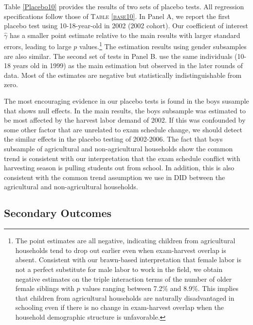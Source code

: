 \documentclass[12pt,letterpaper]{article}
\newcommand{\0}{\ensuremath{\mbox{\boldmath $0$}}}
\begin{document}
Table \ref{Placebo10} provides the results of two sets of placebo tests. All regression specifications follow those of \textsc{Table \ref{base10}}. In Panel A, we report the first placebo test using 10-18-year-old in 2002 (2002 cohort). Our coefficient of interest $\hat{\gamma}$ has a smaller point estimate relative to the main results with larger standard errors, leading to large $p$ values.\footnote{The point estimates are all negative, indicating children from agricultural households tend to drop out earlier even when exam-harvest overlap is absent. Consistent with our brawn-based interpretation that female labor is not a perfect substitute for male labor to work in the field, we obtain negative estimates on the triple interaction terms of the number of older female siblings with $p$ values ranging between 7.2\% and 8.9\%. This implies that children from agricultural households are naturally disadvantaged in schooling even if there is no change in exam-harvest overlap when the household demographic structure is unfavorable. } The estimation results using gender subsamples are also similar. The second set of tests in Panel B. use the same individuals (10-18 years old in 1999) as the main estimation but observed in the later rounds of data. Most of the estimates are negative but statistically indistinguishable from zero. 

The most encouraging evidence in our placebo tests is found in the boys susample that shows null effects. In the main results, the boys subsample was estimated to be most affected by the harvest labor demand of 2002. If this was confounded by some other factor that are unrelated to exam schedule change, we should detect the similar effects in the placebo testing of 2002-2006. The fact that boys subsample of agricultural and non-agricultural households show the common trend is consistent with our interpretation that the exam schedule conflict with harvesting season is pulling students out from school. In addition, this is also consistent with the common trend assumption we use in DID between the agricultural and non-agricultural households. 



\subsection{Secondary Outcomes}
\end{document}
